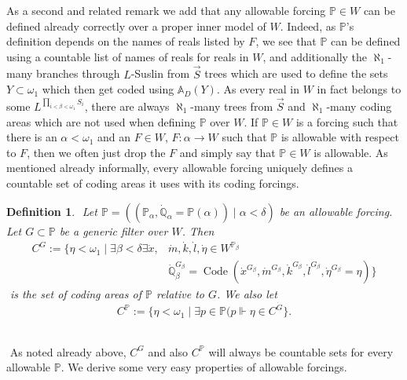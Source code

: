 \documentclass[a4paper,11pt]{article}
\newtheorem{definition}[theorem]{Definition}
\newcommand{\forceP}{\mathbb{P}}
\newcommand{\forceQ}{\mathbb{Q}}
\begin{document}
As a second and related remark we add that any allowable forcing $\forceP \in W$ can  be defined already correctly over a proper inner model of $W$. Indeed, as $\forceP$'s definition depends on the names of reals listed by $F$, we see that $\forceP$ can be defined using a countable list of names of reals for reals in $W$, and additionally the $\aleph_1$-many branches through $L$-Suslin from $\vec{S}$ trees which are used to define the sets $Y \subset \omega_1$ which then get coded using $\mathbb{A}_D (Y)$.
    ﻿
    As every real in $W$ in fact belongs to some $L^{\prod_{i <\beta <\omega_1} S_{i}}$, there are always $\aleph_1$-many trees from $\vec{S}$ and $\aleph_1$-many coding areas which are not used when defining $\forceP$ over $W$.
    If $\forceP \in W$ is a forcing such that there is an $\alpha < \omega_1$ and an $F \in W$, $F: \alpha \rightarrow W$ such that $\forceP$ is allowable with respect to $F$, then we often just drop the $F$ and simply say that $\forceP \in W$ is allowable.
    As mentioned already informally, every allowable forcing uniquely defines a countable set of coding areas it uses with its coding forcings. 
    ﻿
    \begin{definition}
    ﻿
    Let $\forceP= ((\forceP_{\alpha}, \dot{\forceQ}_{\alpha}= \forceP({\alpha})) \mid \alpha < \delta)$ be an allowable forcing. Let $G \subset \forceP$ be a generic filter over $W$. Then
    ﻿
    \begin{align*}
    C^G:= \{ \eta < \omega_1\mid \exists \beta < \delta \exists \dot{x},&\dot{m},\dot{k}, \dot{l}, \dot{\eta} \in W^{\forceP_{\beta}}  \\& \dot{\forceQ}_{\beta}^{G_{\beta}} = \operatorname{Code} (\dot{x}^{G_{\beta}},\dot{m}^{G_{\beta}},\dot{k}^{G_{\beta}},\dot{l}^{G_{\beta}},\dot{\eta}^{G_{\beta}}=\eta )\}
    \end{align*}
    ﻿
    is the set of coding areas of $\forceP$ relative to $G$. 
    ﻿
    We also let 
    ﻿
    \[ C^{\forceP} := \{\eta < \omega_1 \mid \exists p \in \forceP ( p \Vdash \eta  \in C^{\dot{G}} \}. \]
    ﻿
    ﻿
    \end{definition}
    ﻿
    As noted already above, $C^G$ and also $C^{\forceP}$ will always be  countable sets for every allowable $\forceP$. We derive some very easy properties of allowable forcings.
    ﻿
\end{document}
